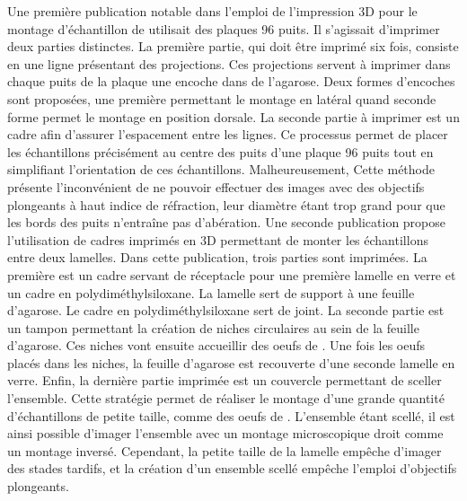 \documentclass[\main/main.tex]{subfiles}
\begin{document}
%
Une première publication notable dans l'emploi de l'impression 3D pour le montage d'échantillon de \pz{} utilisait des plaques 96 puits\cite{wittbrodt_2014}.
%
Il s'agissait d'imprimer deux parties distinctes.%
%
La première partie, qui doit être imprimé six fois, consiste en une ligne présentant des projections.
%
Ces projections servent à imprimer dans chaque puits de la plaque une encoche dans de l'agarose.
%
Deux formes d'encoches sont proposées, une première permettant le montage en latéral quand seconde forme permet le montage en position dorsale.
%
La seconde partie à imprimer est un cadre afin d'assurer l'espacement entre les lignes.
%
Ce processus permet de placer les échantillons précisément au centre des puits d'une plaque 96 puits tout en simplifiant l'orientation de ces échantillons.
%
Malheureusement, Cette méthode présente l'inconvénient de ne pouvoir effectuer des images avec des objectifs plongeants à haut indice de réfraction, leur diamètre étant trop grand pour que les bords des puits n'entraîne pas d'abération.
%
Une seconde publication propose l'utilisation de cadres imprimés en 3D permettant de monter les échantillons entre deux lamelles\cite{alessandri_2017}.
%
Dans cette publication, trois parties sont imprimées.
%
La première est un cadre servant de réceptacle pour une première lamelle en verre et un cadre en polydiméthylsiloxane. La lamelle sert de support à une feuille d'agarose.
Le cadre en polydiméthylsiloxane sert de joint.
%
La seconde partie est un tampon permettant la création de niches circulaires au sein de la feuille d'agarose.
%
Ces niches vont ensuite accueillir des oeufs de \pz{}.
%
Une fois les oeufs placés dans les niches, la feuille d'agarose est recouverte d'une seconde lamelle en verre.
%
Enfin, la dernière partie imprimée est un couvercle permettant de sceller l'ensemble.
%
Cette stratégie permet de réaliser le montage d'une grande quantité d'échantillons de petite taille, comme des oeufs de \pz{}.
%
L'ensemble étant scellé, il est ainsi possible d'imager l'ensemble avec un montage microscopique droit comme un montage inversé.
%
Cependant, la petite taille de la lamelle empêche d'imager des stades tardifs, et la création d'un ensemble scellé empêche l'emploi d'objectifs plongeants.
\end{document}

